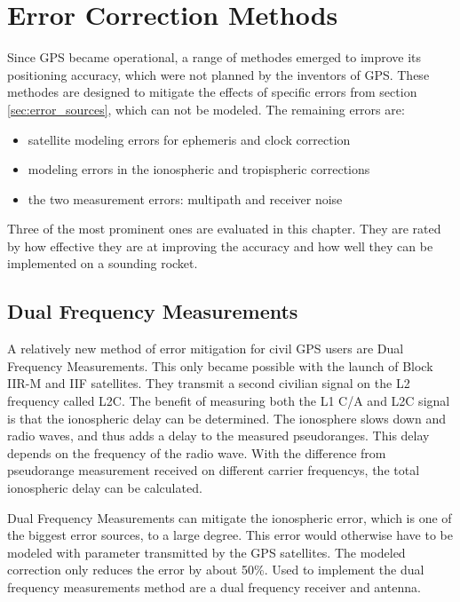 \chapter{Error Correction Methods}\label{ch:error_correction}

Since GPS became operational, a range of methodes emerged to improve its positioning accuracy, which were not planned by the inventors of GPS.
These methodes are designed to mitigate the effects of specific errors from section \ref{sec:error_sources}, which can not be modeled.
The remaining errors are:
\begin{itemize}
 \setlength\itemsep{1pt}
 \item satellite modeling errors for ephemeris and clock correction
 \item modeling errors in the ionospheric and tropispheric corrections
 \item the two measurement errors: multipath and receiver noise
\end{itemize}
Three of the most prominent ones are evaluated in this chapter.
They are rated by how effective they are at improving the accuracy and how well they can be implemented on a sounding rocket.


\section{Dual Frequency Measurements}

A relatively new method of error mitigation for civil GPS users are Dual Frequency Measurements.
This only became possible with the launch of Block IIR-M and IIF satellites.
They transmit a second civilian signal on the L2 frequency called L2C.
The benefit of measuring both the L1 C/A and L2C signal is that the ionospheric delay can be determined.
The ionosphere slows down and radio waves, and thus adds a delay to the measured pseudoranges.
This delay depends on the frequency of the radio wave.
With the difference from pseudorange measurement received on different carrier frequencys, the total ionospheric delay can be calculated.

Dual Frequency Measurements can mitigate the ionospheric error, which is one of the biggest error sources, to a large degree.
This error would otherwise have to be modeled with parameter transmitted by the GPS satellites.
The modeled correction only reduces the error by about 50\%.
Used to implement the dual frequency measurements method are a dual frequency receiver and antenna.
\cite{L1_L2}


